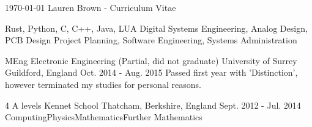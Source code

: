 \documentclass[11pt, a4paper]{awesome-cv}
\begin{document}
\makecvheader

\makecvfooter
  {\today}
  {Lauren Brown - Curriculum Vitae}
  {\thepage}


\begin{cvskills}
  {Rust, Python, C, C++, Java, LUA}
  {Digital Systems Engineering, Analog Design, PCB Design}
  {Project Planning, Software Engineering, Systems Administration}
\end{cvskills}

\begin{cventries}
  \cventry
    {MEng Electronic Engineering (Partial, did not graduate)} %
    {University of Surrey} %
    {Guildford, England} %
    {Oct. 2014 - Aug. 2015} %
    {
      Passed first year with 'Distinction', however terminated my studies for personal reasons.
    }
    
  \cventry
    {4 A levels} %
    {Kennet School} %
    {Thatcham, Berkshire, England} %
    {Sept. 2012 - Jul. 2014} %
    {
      Computing{\enskip\cdotp\enskip}Physics{\enskip\cdotp\enskip}Mathematics{\enskip\cdotp\enskip}Further Mathematics
    }
\end{cventries}
\end{document}
